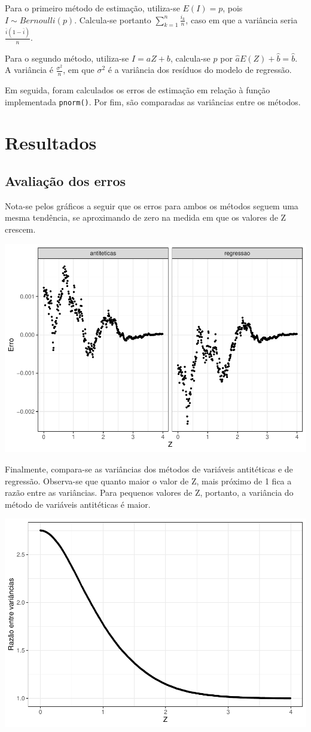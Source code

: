 \documentclass[
]{article}
\begin{document}
Para o primeiro método de estimação, utiliza-se \(E(I)=p\), pois
\(I \sim Bernoulli(p)\). Calcula-se portanto
\(\sum\limits_{k = 1}^{n} \frac{i_{k}}{n}\), caso em que a variância
seria \(\frac{\bar{i}(1- \bar{i})}{n}\).

Para o segundo método, utiliza-se \(I = aZ + b\), calcula-se \(p\) por
\(\hat{a} E(Z) + \hat{b} = \hat{b}\). A variância é
\(\frac{\sigma^2}{n}\), em que \(\sigma^2\) é a variância dos resíduos
do modelo de regressão.

Em seguida, foram calculados os erros de estimação em relação à função
implementada \texttt{pnorm()}. Por fim, são comparadas as variâncias
entre os métodos.

\hypertarget{resultados}{%
\section{Resultados}\label{resultados}}

\hypertarget{avaliauxe7uxe3o-dos-erros}{%
\subsection{Avaliação dos erros}\label{avaliauxe7uxe3o-dos-erros}}

Nota-se pelos gráficos a seguir que os erros para ambos os métodos
seguem uma mesma tendência, se aproximando de zero na medida em que os
valores de Z crescem.

\includegraphics[width=0.6\linewidth]{tp-3_files/figure-latex/calculo-acumuladas-1}

Finalmente, compara-se as variâncias dos métodos de variáveis
antitéticas e de regressão. Observa-se que quanto maior o valor de Z,
mais próximo de 1 fica a razão entre as variâncias. Para pequenos
valores de Z, portanto, a variância do método de variáveis antitéticas é
maior.

\includegraphics[width=0.6\linewidth]{tp-3_files/figure-latex/compara-variancias-1}
\end{document}
